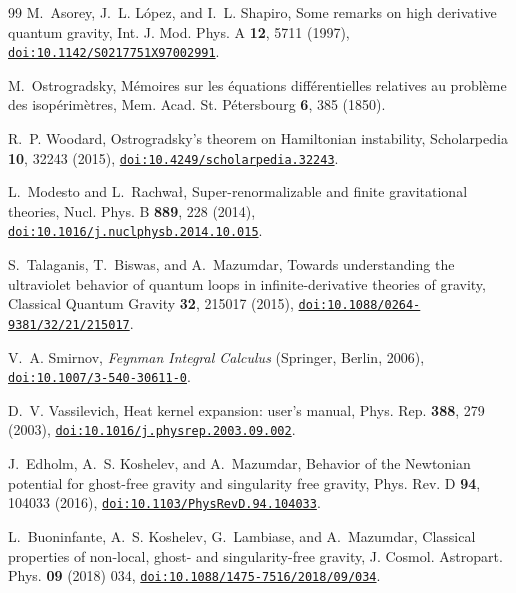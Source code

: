 \documentclass[aps,prd,10pt,twocolumn,superscriptaddress,nofootinbib,floatfix,longbibliography,showpacs,showkeys]{revtex4-2}
\theoremstyle{plain}
\theoremstyle{definition}
\theoremstyle{remark}
\begin{document}
\begin{thebibliography}{99}
M.~Asorey, J.~L. L\'opez, and I.~L. Shapiro, Some remarks on high derivative quantum gravity, Int. J. Mod. Phys. A \textbf{12}, 5711 (1997), \href{https://doi.org/10.1142/S0217751X97002991}{\nolinkurl{doi:10.1142/S0217751X97002991}}.

M.~Ostrogradsky, M\'emoires sur les \'equations diff\'erentielles relatives au probl\`eme des isop\'erim\`etres, Mem. Acad. St. P\'etersbourg \textbf{6}, 385 (1850).

R.~P. Woodard, Ostrogradsky's theorem on Hamiltonian instability, Scholarpedia \textbf{10}, 32243 (2015), \href{https://doi.org/10.4249/scholarpedia.32243}{\nolinkurl{doi:10.4249/scholarpedia.32243}}.

L.~Modesto and L.~Rachwa{\l}, Super-renormalizable and finite gravitational theories, Nucl. Phys. B \textbf{889}, 228 (2014), \href{https://doi.org/10.1016/j.nuclphysb.2014.10.015}{\nolinkurl{doi:10.1016/j.nuclphysb.2014.10.015}}.

S.~Talaganis, T.~Biswas, and A.~Mazumdar, Towards understanding the ultraviolet behavior of quantum loops in infinite-derivative theories of gravity, Classical Quantum Gravity \textbf{32}, 215017 (2015), \href{https://doi.org/10.1088/0264-9381/32/21/215017}{\nolinkurl{doi:10.1088/0264-9381/32/21/215017}}.

V.~A. Smirnov, \emph{Feynman Integral Calculus} (Springer, Berlin, 2006), \href{https://doi.org/10.1007/3-540-30611-0}{\nolinkurl{doi:10.1007/3-540-30611-0}}.

D.~V. Vassilevich, Heat kernel expansion: user's manual, Phys. Rep. \textbf{388}, 279 (2003), \href{https://doi.org/10.1016/j.physrep.2003.09.002}{\nolinkurl{doi:10.1016/j.physrep.2003.09.002}}.

J.~Edholm, A.~S. Koshelev, and A.~Mazumdar, Behavior of the Newtonian potential for ghost-free gravity and singularity free gravity, Phys. Rev. D \textbf{94}, 104033 (2016), \href{https://doi.org/10.1103/PhysRevD.94.104033}{\nolinkurl{doi:10.1103/PhysRevD.94.104033}}.

L.~Buoninfante, A.~S. Koshelev, G.~Lambiase, and A.~Mazumdar, Classical properties of non-local, ghost- and singularity-free gravity, J. Cosmol. Astropart. Phys. \textbf{09} (2018) 034, \href{https://doi.org/10.1088/1475-7516/2018/09/034}{\nolinkurl{doi:10.1088/1475-7516/2018/09/034}}.


\end{thebibliography}
\end{document}
